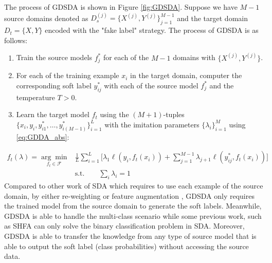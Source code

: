 The process of GDSDA is shown in Figure \ref{fig:GDSDA}. Suppose we have $M-1$ source domains denoted as $D_s^{(j)}=\{X^{(j)},Y^{(j)}\}_{j=1}^{M-1}$ and the target domain $D_t=\{X,Y\}$ encoded with the "fake label" strategy. The process of GDSDA is as follows:
\begin{enumerate}
    \item Train the source models $f^*_j$ for each of the $M-1$ domains with $\{X^{(j)},Y^{(j)}\}$.
    \item For each of the training example $x_i$ in the target domain, computer the corresponding soft label $y^*_{ij}$ with each of the source model $f^*_j$ and the temperature $T>0$.
    \item Learn the target model $f_t$ using the $(M+1)$-tuples $\{x_i,y_i,y^*_{i1},\dots,y^*_{i(M-1)}\}_{i=1}^L$ with the imitation parameters $\{\lambda_i\}^M_{i=1}$ using \eqref{eq:GDDA_abs}:
\end{enumerate} 
\begin{equation}\label{eq:GDDA_abs}
\begin{aligned}
f_t(\lambda)=\underset{f_t \in \mathcal{F}}{\arg \min}&\frac{1}{L}\sum_{i=1}^{L}\bigg[\lambda_1\ell\left(y_i,f_t(x_i)\right)+\sum_{j=1}^{M-1}\lambda_{j+1}\ell\left(y^*_{ij},f_t(x_i)\right)\bigg]\qquad\\
 &\text{s.t.} \qquad \sum_i\lambda_i=1
\end{aligned}
\end{equation}
Compared to other work of SDA which requires to use each example of the source domain, by either re-weighting \cite{Donahue_2013_CVPR,duan2012visual} or feature augmentation \cite{daume2010frustratingly}, GDSDA only requires the trained model from the source domain to generate the soft labels. 
Meanwhile, GDSDA is able to handle the multi-class scenario while some previous work, such as SHFA\cite{duan2012learning} can only solve the binary classification problem in SDA. Moreover, GDSDA is able to transfer the knowledge from any type of source model that is able to output the soft label (class probabilities) without accessing the source data.

